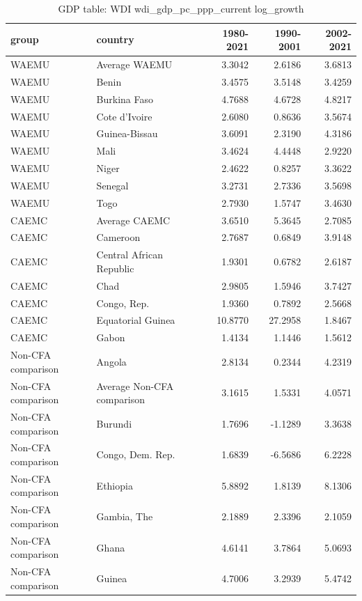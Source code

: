 \begin{table}

\caption{GDP table: WDI wdi_gdp_pc_ppp_current log_growth}
\centering
\begin{tabular}[t]{llrrr}
\toprule
group & country & 1980-2021 & 1990-2001 & 2002-2021\\
\midrule
WAEMU & Average WAEMU & 3.3042 & 2.6186 & 3.6813\\
WAEMU & Benin & 3.4575 & 3.5148 & 3.4259\\
WAEMU & Burkina Faso & 4.7688 & 4.6728 & 4.8217\\
WAEMU & Cote d'Ivoire & 2.6080 & 0.8636 & 3.5674\\
WAEMU & Guinea-Bissau & 3.6091 & 2.3190 & 4.3186\\
\addlinespace
WAEMU & Mali & 3.4624 & 4.4448 & 2.9220\\
WAEMU & Niger & 2.4622 & 0.8257 & 3.3622\\
WAEMU & Senegal & 3.2731 & 2.7336 & 3.5698\\
WAEMU & Togo & 2.7930 & 1.5747 & 3.4630\\
CAEMC & Average CAEMC & 3.6510 & 5.3645 & 2.7085\\
\addlinespace
CAEMC & Cameroon & 2.7687 & 0.6849 & 3.9148\\
CAEMC & Central African Republic & 1.9301 & 0.6782 & 2.6187\\
CAEMC & Chad & 2.9805 & 1.5946 & 3.7427\\
CAEMC & Congo, Rep. & 1.9360 & 0.7892 & 2.5668\\
CAEMC & Equatorial Guinea & 10.8770 & 27.2958 & 1.8467\\
\addlinespace
CAEMC & Gabon & 1.4134 & 1.1446 & 1.5612\\
Non-CFA comparison & Angola & 2.8134 & 0.2344 & 4.2319\\
Non-CFA comparison & Average Non-CFA comparison & 3.1615 & 1.5331 & 4.0571\\
Non-CFA comparison & Burundi & 1.7696 & -1.1289 & 3.3638\\
Non-CFA comparison & Congo, Dem. Rep. & 1.6839 & -6.5686 & 6.2228\\
\addlinespace
Non-CFA comparison & Ethiopia & 5.8892 & 1.8139 & 8.1306\\
Non-CFA comparison & Gambia, The & 2.1889 & 2.3396 & 2.1059\\
Non-CFA comparison & Ghana & 4.6141 & 3.7864 & 5.0693\\
Non-CFA comparison & Guinea & 4.7006 & 3.2939 & 5.4742\\

\end{tabular}
\end{table}
